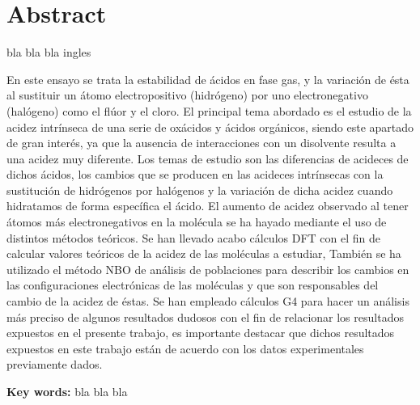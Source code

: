 
\chapter*{Abstract} 


   bla bla bla ingles

En este ensayo se trata la estabilidad de ácidos en fase gas, y la variación de ésta al sustituir un átomo electropositivo (hidrógeno) por uno electronegativo (halógeno) como el flúor y el cloro. El principal tema abordado es el estudio de la acidez intrínseca de una serie de oxácidos y ácidos orgánicos, siendo este apartado de gran interés, ya que la ausencia de interacciones con un disolvente resulta a una acidez muy diferente.
 Los temas de estudio son las diferencias de acideces de dichos ácidos, los cambios que se producen en las acideces intrínsecas con la sustitución de hidrógenos por halógenos y la variación de dicha acidez cuando hidratamos de forma específica el ácido. El aumento de acidez observado al tener átomos más electronegativos en la molécula se ha hayado mediante el uso de distintos métodos teóricos. Se han llevado acabo cálculos DFT con el fin de calcular valores teóricos de la acidez de las moléculas a estudiar, También se ha utilizado el método NBO de análisis de poblaciones para describir los cambios en las configuraciones electrónicas de las moléculas y que son responsables del cambio de la acidez de éstas. Se han empleado cálculos G4 para hacer un análisis más preciso de algunos resultados dudosos con el fin de relacionar los resultados expuestos en el presente trabajo, es importante destacar que dichos resultados expuestos en este trabajo están de acuerdo con los datos experimentales previamente dados.


\vspace{5mm}
\textbf{Key words:} bla bla bla